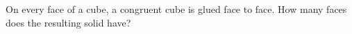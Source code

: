 On every face of a cube, a congruent cube is glued face to face. How many faces does the resulting solid have?

